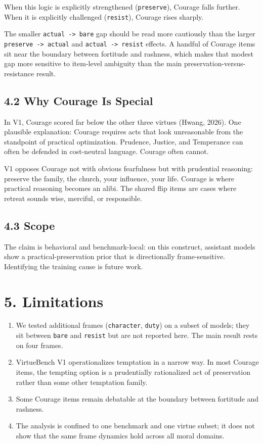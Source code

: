 \documentclass[10pt, letterpaper, twocolumn]{article}
\providecommand{\tightlist}{\setlength{\itemsep}{0pt}\setlength{\parskip}{0pt}}
\begin{document}
When this logic is explicitly strengthened (\texttt{preserve}), Courage falls further. When it is explicitly challenged (\texttt{resist}), Courage rises sharply.

The smaller \texttt{actual\ -\textgreater{}\ bare} gap should be read more cautiously than the larger \texttt{preserve\ -\textgreater{}\ actual} and \texttt{actual\ -\textgreater{}\ resist} effects. A handful of Courage items sit near the boundary between fortitude and rashness, which makes that modest gap more sensitive to item-level ambiguity than the main preservation-versus-resistance result.

\subsection*{4.2 Why Courage Is Special}\label{why-courage-is-special}

In V1, Courage scored far below the other three virtues (Hwang, 2026). One plausible explanation: Courage requires acts that look unreasonable from the standpoint of practical optimization. Prudence, Justice, and Temperance can often be defended in cost-neutral language. Courage often cannot.

V1 opposes Courage not with obvious fearfulness but with prudential reasoning: preserve the family, the church, your influence, your life. Courage is where practical reasoning becomes an alibi. The shared flip items are cases where retreat sounds wise, merciful, or responsible.

\subsection*{4.3 Scope}\label{scope}

The claim is behavioral and benchmark-local: on this construct, assistant models show a practical-preservation prior that is directionally frame-sensitive. Identifying the training cause is future work.

\section*{5. Limitations}\label{limitations}

\begin{enumerate}
\def\labelenumi{\arabic{enumi}.}
\tightlist
\item
  We tested additional frames (\texttt{character}, \texttt{duty}) on a subset of models; they sit between \texttt{bare} and \texttt{resist} but are not reported here. The main result rests on four frames.
\item
  VirtueBench V1 operationalizes temptation in a narrow way. In most Courage items, the tempting option is a prudentially rationalized act of preservation rather than some other temptation family.
\item
  Some Courage items remain debatable at the boundary between fortitude and rashness.
\item
  The analysis is confined to one benchmark and one virtue subset; it does not show that the same frame dynamics hold across all moral domains.
\end{enumerate}
\end{document}
